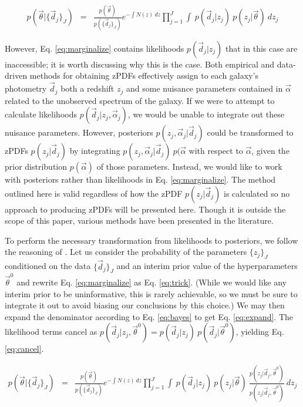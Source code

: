 \documentclass[preprint]{aastex}
\begin{document}
\begin{eqnarray}
\label{eq:marginalize}
p(\vec{\theta}|\{\vec{d}_{j}\}_{J}) &=& \frac{p(\vec{\theta})}{p(\{\vec{d}_{j}\}_{J})}e^{-\int N(z)\ dz}\prod_{j=1}^{J}\int\ p(\vec{d}_{j}|z_{j})\ p(z_{j}|\vec{\theta})\ dz_{j}
\end{eqnarray}

However, Eq. \ref{eq:marginalize} contains likelihoods $p(\vec{d}_{j}|z_{j})$ that in this case are inaccessible; it is worth discussing why this is the case.  Both empirical and data-driven methods for obtaining zPDFs effectively assign to each galaxy's photometry $\vec{d}_{j}$ both a redshift $z_{j}$ and some nuisance parameters contained in $\vec{\alpha}$ related to the unobserved spectrum of the galaxy.  If we were to attempt to calculate likelihoods $p(\vec{d}_{j}|z_{j},\vec{\alpha}_{j})$, we would be unable to integrate out these nuisance parameters.  However, posteriors $p(z_{j},\vec{\alpha}_{j}|\vec{d}_{j})$ could be transformed to zPDFs $p(z_{j}|\vec{d}_{j})$ by integrating $p(z_{j},\vec{\alpha}_{j}|\vec{d}_{j})\ p(\vec{\alpha}$ with respect to $\vec{\alpha}$, given the prior distribution $p(\vec{\alpha})$ of those parameters.  Instead, we would like to work with posteriors rather than likelihoods in Eq. \ref{eq:marginalize}.  The method outlined here is valid regardless of how the zPDF $p(z_{j}|\vec{d}_{j})$ is calculated so no approach to producing zPDFs will be presented here.  Though it is outside the scope of this paper, various methods have been presented in the literature. \citep{she11, bal08, car13, car14}

To perform the necessary transformation from likelihoods to posteriors, we follow the reasoning of \citet{mar15}.  Let us consider the probability of the parameters $\{z_{j}\}_{J}$ conditioned on the data $\{\vec{d}_{j}\}_{J}$ and an interim prior value of the hyperparameters $\vec{\theta}^{0}$ and rewrite Eq. \ref{eq:marginalize} as Eq. \ref{eq:trick}.  (While we would like any interim prior to be uninformative, this is rarely achievable, so we must be sure to integrate it out to avoid biasing our conclusions by this choice.)  We may then expand the denominator according to Eq. \ref{eq:bayes} to get Eq. \ref{eq:expand}.  The likelihood terms cancel as $p(\vec{d}_{j}|z_{j},\vec{\theta}^{0})=p(\vec{d}_{j}|z_{j})\ p(\vec{d}_{j}|\vec{\theta}^{0})$, yielding Eq. \ref{eq:cancel}.

\begin{eqnarray}
\label{eq:trick}
p(\vec{\theta}|\{\vec{d}_{j}\}_{J}) &=& \frac{p(\vec{\theta})}{p(\{\vec{d}_{j}\}_{J})}e^{-\int N(z)\ dz}\prod_{j=1}^{J}\int\ p(\vec{d}_{j}|z_{j})\ p(z_{j}|\vec{\theta})\ \frac{p(z_{j}|\vec{d}_{j},\vec{\theta}^{0})}{p(z_{j}|\vec{d}_{j},\vec{\theta}^{0})}\ dz_{j}
\end{eqnarray}
\end{document}
